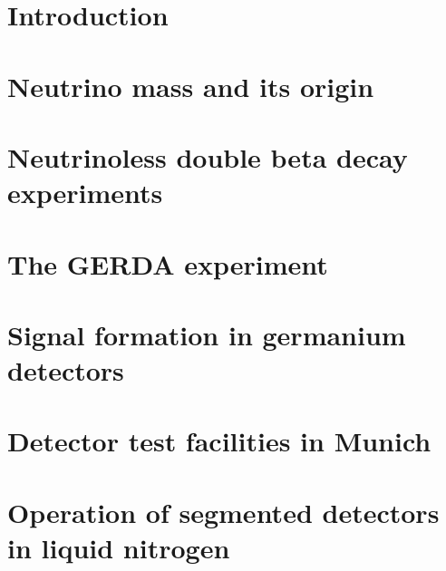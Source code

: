 \documentclass[11pt,a4paper]{book}
\begin{document}
\pagestyle{empty}



\cleardoublepage



\cleardoublepage \setcounter{page}{1} 

\tableofcontents

\cleardoublepage \setcounter{page}{1} 

\pagestyle{headings}

\chapter{Introduction}
\label{cha:intro}

\clearpage{\pagestyle{empty}\cleardoublepage}

\chapter{Neutrino mass and its origin}
\label{cha:theory}

\clearpage{\pagestyle{empty}\cleardoublepage}

\chapter{Neutrinoless double beta decay experiments}
\label{cha:exps}

\clearpage{\pagestyle{empty}\cleardoublepage}

\chapter{The GERDA experiment}
\label{cha:gerda}

\clearpage{\pagestyle{empty}\cleardoublepage}

\chapter{Signal formation in germanium detectors}
\label{cha:detector}

\clearpage{\pagestyle{empty}\cleardoublepage}

\chapter{Detector test facilities in Munich}
\label{cha:teststand}

\clearpage{\pagestyle{empty}\cleardoublepage}

\chapter{Operation of segmented detectors in liquid nitrogen}
\label{cha:GII}

\clearpage{\pagestyle{empty}\cleardoublepage}
\end{document}
